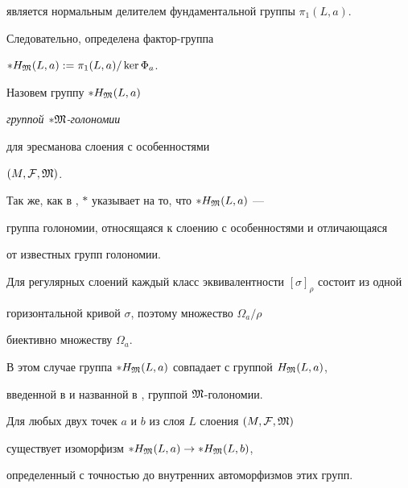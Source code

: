 является нормальным делителем фундаментальной группы $\pi_1(L,a)$.


Следовательно, определена фактор-группа


$*H_{\frak M}(L,a):=\pi_1(L,a)/\ker\Phi_a$.


Назовем группу $*H_{\frak M}(L,a)$ {\it группой $*\frak M$-голономии


для эресманова слоения с особенностями} $(M,{\cal F},\frak M)$.





Так же, как в \cite{Pi}, $*$ указывает на то, что $*H_{\frak M}(L,a)$ ---


группа голономии, относящаяся к слоению с особенностями и отличающаяся


от известных групп голономии.


Для регулярных слоений каждый класс эквивалентности $[\sigma]_{\rho}$ состоит из одной


горизонтальной кривой $\sigma$, поэтому множество $\Omega_a/\rho$


биективно множеству $\Omega_a$.


В этом случае группа $*H_{\frak M}(L,a)$ совпадает с группой $H_{\frak M}(L,a)$,


введенной в \cite{BH} и названной в \cite{Z2}, \cite{Z3} группой $\frak M$-голономии.





\begin{prop}\label{ab}


Для любых двух точек $a$ и $b$ из слоя $L$ слоения $(M,{\cal F},\frak M)$


существует изоморфизм $*H_{\frak M}(L,a)\to *H_{\frak M}(L,b)$,


определенный с точностью до внутренних автоморфизмов этих групп.


\end{prop}





